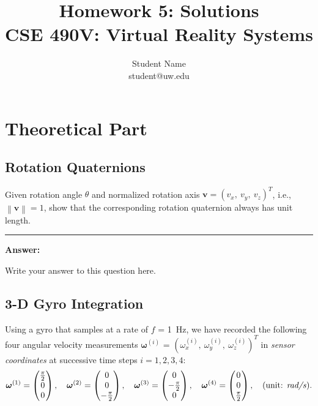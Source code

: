 \documentclass[conference]{styles/acmsiggraph}
\title{\huge Homework 5: Solutions \\ \LARGE {CSE 490V: Virtual Reality Systems}}
\author{\Large Student Name \\ student@uw.edu}
\newcommand{\norm}[1]{\left\lVert#1\right\rVert}
\renewcommand{\vec}[1]{\mathbf{#1}}
\newenvironment{answer}{}{}
\newcommand{\points}[1]{\hfill \normalfont{(\textit{#1pts})}}
\begin{document}
\maketitle

\section{Theoretical Part}


\subsection{Rotation Quaternions \points{5}}
Given rotation angle $\theta$ and normalized rotation axis $\vec{v} = \left( v_x,\ v_y,\ v_z \right)^T$, i.e., $\norm{\vec{v}} = 1$, show that the corresponding rotation quaternion always has unit length.

\begin{answer}
\rule{\textwidth}{0.4pt}
\textbf{Answer:}

Write your answer to this question here.

\end{answer}


\newpage
\subsection{3-D Gyro Integration \points{18}}
%
Using a gyro that samples at a rate of $f$ = 1~Hz, we have recorded the following four angular velocity measurements $\boldsymbol{\omega}^{(i)}$ = $\left(\omega_{x}^{(i)},\ \omega_{y}^{(i)},\ \omega_{z}^{(i)} \right)^T$ in \textit{sensor coordinates} at successive time steps $i=1,2,3,4$:
%
$$\boldsymbol\omega^{(1)}=\begin{pmatrix}
\frac{\pi}{2} \\ 0 \\ 0
\end{pmatrix}, \quad
\boldsymbol\omega^{(2)}=\begin{pmatrix}
0 \\ 0 \\ -\frac{\pi}{2}
\end{pmatrix}, \quad
\boldsymbol\omega^{(3)}=\begin{pmatrix}
0 \\ -\frac{\pi}{2} \\ 0
\end{pmatrix}, \quad
\boldsymbol\omega^{(4)}=\begin{pmatrix}
0 \\ 0 \\ \frac{\pi}{2}
\end{pmatrix}, \quad \text{(unit: \textit{rad/s})}.$$
\end{document}
